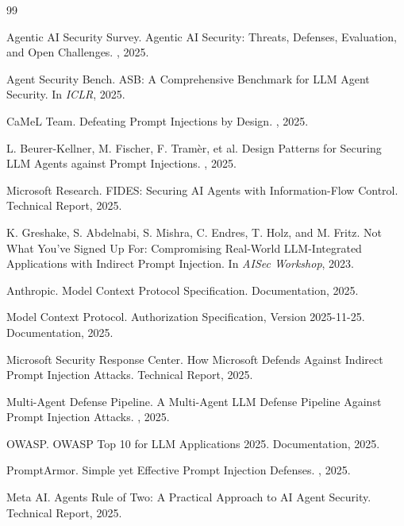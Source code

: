 \begin{thebibliography}{99}

Agentic AI Security Survey.
\newblock Agentic AI Security: Threats, Defenses, Evaluation, and Open Challenges.
, 2025.

Agent Security Bench.
\newblock ASB: A Comprehensive Benchmark for LLM Agent Security.
\newblock In {\em ICLR}, 2025.

CaMeL Team.
\newblock Defeating Prompt Injections by Design.
, 2025.

L. Beurer-Kellner, M. Fischer, F. Tramèr, et al.
\newblock Design Patterns for Securing LLM Agents against Prompt Injections.
, 2025.

Microsoft Research.
\newblock FIDES: Securing AI Agents with Information-Flow Control.
\newblock Technical Report, 2025.

K. Greshake, S. Abdelnabi, S. Mishra, C. Endres, T. Holz, and M. Fritz.
\newblock Not What You've Signed Up For: Compromising Real-World LLM-Integrated Applications with Indirect Prompt Injection.
\newblock In {\em AISec Workshop}, 2023.

Anthropic.
\newblock Model Context Protocol Specification.
\newblock Documentation, 2025.

Model Context Protocol.
\newblock Authorization Specification, Version 2025-11-25.
\newblock Documentation, 2025.

Microsoft Security Response Center.
\newblock How Microsoft Defends Against Indirect Prompt Injection Attacks.
\newblock Technical Report, 2025.

Multi-Agent Defense Pipeline.
\newblock A Multi-Agent LLM Defense Pipeline Against Prompt Injection Attacks.
, 2025.

OWASP.
\newblock OWASP Top 10 for LLM Applications 2025.
\newblock Documentation, 2025.

PromptArmor.
\newblock Simple yet Effective Prompt Injection Defenses.
, 2025.

Meta AI.
\newblock Agents Rule of Two: A Practical Approach to AI Agent Security.
\newblock Technical Report, 2025.


\end{thebibliography}

